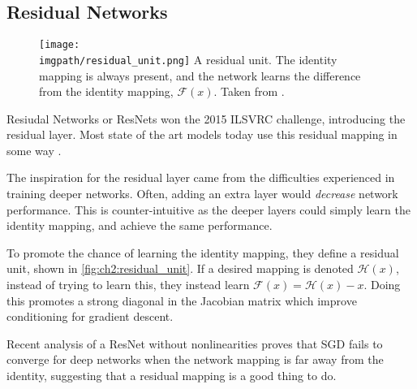\subsection{Residual Networks}\label{sec:ch2:resnets}
  \begin{figure}[tb]
    \centering
    \texttt{[image: \\imgpath/residual\_unit.png]}
          {A residual unit. The identity mapping is always present, and the
            network learns the difference from the identity mapping, $\mathcal{F}(x)$.
            Taken from \cite{he_deep_2016}.}
      \label{fig:ch2:residual_unit}
  \end{figure}
  Resiudal Networks or ResNets won the 2015 ILSVRC challenge, introducing the
  residual layer. Most state of the art models today use this residual mapping
  in some way \cite{zagoruyko_wide_2016-1, xie_aggregated_2017}.

  The inspiration for the residual layer came from the difficulties
  experienced in training deeper networks.  Often, adding an extra layer would
  \emph{decrease} network performance. This is counter-intuitive as the deeper
  layers could simply learn the identity mapping, and achieve the same
  performance.

  To promote the chance of learning the identity mapping, they define a residual
  unit, shown in \autoref{fig:ch2:residual_unit}. If a desired mapping is
  denoted $\mathcal{H}(x)$, instead of trying to learn this, they instead learn
  $\mathcal{F}(x) = \mathcal{H}(x) - x$. Doing this promotes a strong diagonal
  in the Jacobian matrix which improve conditioning for gradient descent. 
  
  Recent analysis of a ResNet without nonlinearities
  \cite{bartlett_representing_2018, bartlett_gradient_2018} proves that SGD
  fails to converge for deep networks when the network mapping is far away from
  the identity, suggesting that a residual mapping is a good thing to do.
